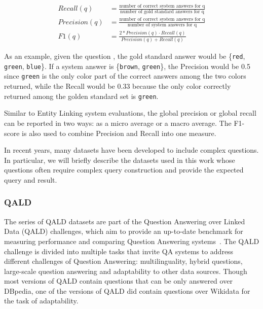 \begin{equation}
    \begin{aligned}
    Recall(q) &= \frac{\mbox{number of correct system answers for q}}{\mbox{number of gold standard answers for q}} \\
    Precision(q) &= \frac{\mbox{number of correct system answers for q}}{\mbox{number of system answers for q}} \\
    F1(q) &= \frac{2 \ast Precision(q) \cdot Recall(q)}{Precision(q)+Recall(q)}
    \end{aligned}
\end{equation}

As an example, given the question , the gold standard 
answer would be \{\texttt{red}, \texttt{green}, \texttt{blue}\}. If a system answer is 
\{\texttt{brown}, \texttt{green}\}, the Precision would be 0.5 since \texttt{green} is the 
only color part of the correct answers among the two colors returned, while the Recall would be 
0.33 because the only color correctly returned among the golden standard set is \texttt{green}.

Similar to Entity Linking system evaluations, the global precision or global recall can be 
reported in two ways: as a micro average or a macro average. The F1-score is also used to 
combine Precision and Recall into one measure.

In recent years, many datasets have been developed to include complex questions. In particular, 
we will briefly describe the datasets used in this work whose questions often require complex 
query construction and provide the expected query and result.

\subsubsection{QALD}
\label{cap2:qakg/benchmarkDatasets/qald}
The series of QALD datasets are part of the Question Answering over Linked Data (QALD) challenges, 
which aim to provide an up-to-date benchmark for measuring performance and comparing Question 
Answering systems~\cite{qa:qald-Lopezetal2013}. The QALD challenge is divided into multiple 
tasks that invite QA systems to address different challenges of Question Answering: 
multilinguality, hybrid questions, large-scale question answering and adaptability to other 
data sources. Though most versions of QALD contain questions that can be only answered over 
DBpedia, one of the versions of QALD did contain questions over Wikidata for the task of 
adaptability.

